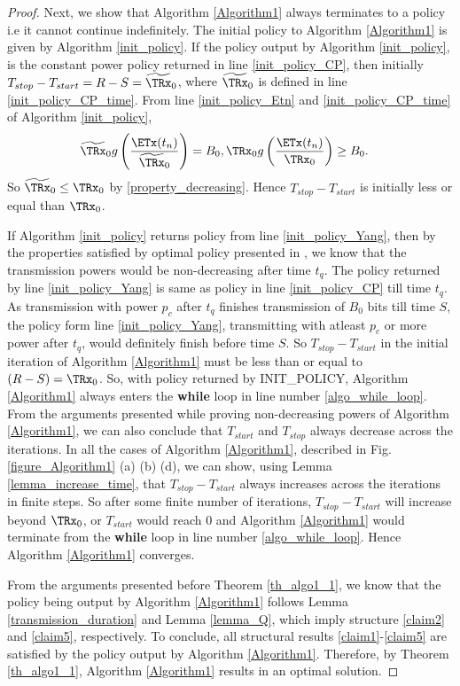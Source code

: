 \begin{proof}
Next, we show that Algorithm \ref{Algorithm1} always terminates to a policy i.e it cannot continue indefinitely. The initial policy to Algorithm \ref{Algorithm1} is given by Algorithm \ref{init_policy}. If the policy output by Algorithm \ref{init_policy}, is the constant power policy returned in line \ref{init_policy_CP}, then initially $T_{stop}-T_{start}=R-S=\widetilde{\TRx}_0$, where $\widetilde{\TRx}_0$ is defined in line \ref{init_policy_CP_time}. From line \ref{init_policy_Etn} and \ref{init_policy_CP_time} of Algorithm \ref{init_policy}, 
\begin{align}
& \widetilde{\TRx}_0g\left(\dfrac{\ETx(t_n)}{\widetilde{\TRx}_0}\right) = B_0, \TRx_0g\left(\dfrac{\ETx(t_n)}{\TRx_0}\right) \ge B_0.
\end{align}    
So $\widetilde{\TRx}_0\le \TRx_0$ by \eqref{property_decreasing}. Hence $T_{stop}-T_{start}$ is initially less or equal than $\TRx_0$.

If Algorithm \ref{init_policy} returns policy from line \ref{init_policy_Yang}, then by the properties satisfied by optimal policy presented in \cite{Yang}, we know that the transmission powers would be non-decreasing after time $t_q$. The policy returned by line \ref{init_policy_Yang} is same as policy in line \ref{init_policy_CP} till time $t_q$. As transmission with power $p_c$ after $t_q$ finishes transmission of $B_0$ bits till time $S$, the policy form line \ref{init_policy_Yang}, transmitting with atleast $p_c$ or more power after $t_q$, would definitely finish before time $S$. So $T_{stop}-T_{start}$ in the initial iteration of Algorithm \ref{Algorithm1} must be less than or equal to $(R-S)=\TRx_0$. So, with policy returned by INIT\_POLICY, Algorithm \ref{Algorithm1} always enters the \textbf{while} loop in line number \ref{algo_while_loop}. From the arguments presented while proving non-decreasing powers of Algorithm \ref{Algorithm1}, we can also conclude that $T_{start}$ and $T_{stop}$ always decrease across the iterations. In all the cases of Algorithm \ref{Algorithm1}, described in Fig. \ref{figure_Algorithm1} (a) (b) (d), we can show, using Lemma \ref{lemma_increase_time}, that $T_{stop}-T_{start}$ always increases across the iterations in finite steps. So after some finite number of iterations, $T_{stop}-T_{start}$ will increase beyond $\TRx_0$, or $T_{start}$ would reach 0 and Algorithm \ref{Algorithm1} would terminate from the \textbf{while} loop in line number \ref{algo_while_loop}. Hence Algorithm \ref{Algorithm1} converges.
 
From the arguments presented before Theorem \ref{th_algo1_1}, we know that the policy being output by Algorithm \ref{Algorithm1} follows Lemma \ref{transmission_duration} and Lemma \ref{lemma_Q}, which imply structure \eqref{claim2} and \eqref{claim5}, respectively. To conclude, all structural results \eqref{claim1}-\eqref{claim5} are satisfied by the policy output by Algorithm \ref{Algorithm1}. Therefore,  by Theorem \ref{th_algo1_1}, Algorithm \ref{Algorithm1} results in an optimal solution.


\end{proof}
